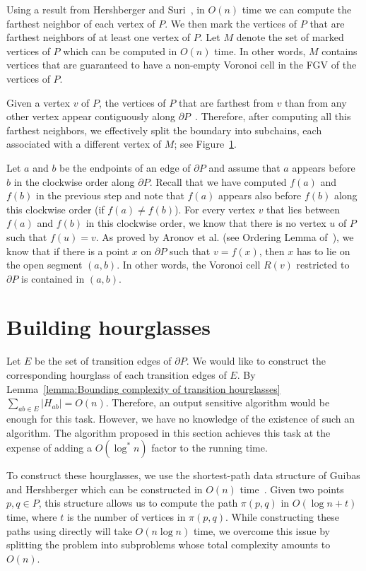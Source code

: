 \documentclass[a4paper,UKenglish]{lipics}
\newcommand{\ff}[1]{\ensuremath{f(#1)}}
\newcommand{\p}[2]{\ensuremath{\pi(#1, #2)}}
\begin{document}
Using a result from Hershberger and Suri~\cite{hershberger1993matrix}, in $O(n)$ time we can compute the farthest neighbor of each vertex of $P$.
We then mark the vertices of $P$ that are farthest neighbors of at least one vertex of $P$.
Let $M$ denote the set of marked vertices of $P$ which can be computed in $O(n)$ time.
In other words, $M$ contains vertices that are guaranteed to have a non-empty Voronoi cell in the FGV of the vertices of $P$.

Given a vertex $v$ of $P$, the vertices of $P$ that are farthest from $v$ than from any other vertex appear contiguously along $\partial P$~\cite{aronov1993furthest}. Therefore, after computing all this farthest neighbors, we effectively split the boundary into subchains, each associated with a different vertex of $M$; see Figure~\ref{}.

Let $a$ and $b$ be the endpoints of an edge of $\partial P$ and assume that $a$ appears before $b$ in the clockwise order along $\partial P$. Recall that we have computed $\ff{a}$ and $\ff{b}$ in the previous step and note that $\ff{a}$ appears also before $\ff{b}$ along this clockwise order (if $\ff{a} \neq \ff{b}$). 
For every vertex $v$ that lies between $\ff{a}$ and $\ff{b}$ in this clockwise order, we know that there is no vertex $u$ of $P$ such that $\ff{u} = v$.
As proved by Aronov et al. (see Ordering Lemma of~\cite{aronov1993furthest}), we know that if there is a point $x$ on $\partial P$ such that $v = \ff{x}$, then $x$ has to lie on the open segment $(a,b)$. 
In other words, the Voronoi cell $R(v)$ restricted to $\partial P$ is contained in $(a,b)$.

\section{Building hourglasses}

Let $E$ be the set of transition edges of $\partial P$.
We would like to construct the corresponding hourglass of each transition edges of $E$.
By Lemma~\ref{lemma:Bounding complexity of transition hourglasses} $\sum_{ab\in E} |H_{ab}| = O(n)$.
Therefore, an output sensitive algorithm would be enough for this task. 
However, we have no knowledge of the existence of such an algorithm. 
The algorithm proposed in this section achieves this task at the expense of adding a $O(\log^*n)$ factor to the running time.

To construct these hourglasses, we use the shortest-path data structure of Guibas and Hershberger which can be constructed in $O(n)$ time~\cite{guibasShortestPathQueries}. 
Given two points $p,q\in P$, this structure allows us to compute the path $\p{p}{q}$ in $O(\log n + t)$ time, where $t$ is the number of vertices in $\p{p}{q}$. 
While constructing these paths using directly will take $O(n \log n)$ time, we overcome this issue by splitting the problem into subproblems whose total complexity amounts to $O(n)$.
 
\end{document}
